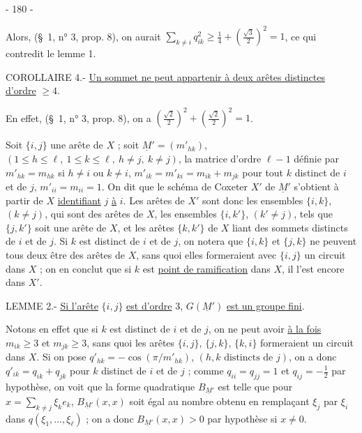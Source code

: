 \begin{center}- 180 -\end{center}

Alors, (\S\ 1, n° 3, prop. 8), on aurait $\displaystyle\sum_{k\ne i}q_{ik}^2\geq\frac14+(\frac{\sqrt3}{2})^2=1$, ce qui contredit le lemme 1.

COROLLAIRE 4.- \uline{Un sommet ne peut appartenir à deux arêtes distinctes d'ordre} $\geq4$.

En effet, (\S\ 1, n° 3, prop. 8), on a $(\frac{\sqrt2}{2})^2+(\frac{\sqrt2}{2})^2=1$.

Soit $\{i,j\}$ une arête de $X$ ; soit $\underline M'=(m'_{hk})$, $(1\leq h\leq\ell,\ 1\leq k\leq\ell,\ h\ne j,\ k\ne j)$, la matrice d'ordre $\ell-1$ définie par $m'_{hk}=m_{hk}$ si $h\ne i$ ou $k\ne i$, $m'_{ik}=m'_{ki}=m_{ik}+m_{jk}$ pour tout $k$ distinct de $i$ et de $j$, $m'_{ii}=m_{ii}=1$. On dit que le schéma de Coxeter $X'$ de $\underline M'$ s'obtient à partir de $X$ \uline{identifiant} $j$ \uline{à} $i$. Les arêtes de $X'$ sont donc les ensembles $\{i,k\}$, $(k\ne j)$, qui sont des arêtes de $X$, les ensembles $\{i,k'\}$, $(k'\ne j)$, tels que $\{j,k'\}$ soit une arête de $X$, et les arêtes $\{k,k'\}$ de $X$ liant des sommets distincts de $i$ et de $j$. Si $k$ est distinct de $i$ et de $j$, on notera que $\{i,k\}$ et $\{j,k\}$ ne peuvent tous deux être des arêtes de $X$, sans quoi elles formeraient avec $\{i,j\}$ un circuit dans $X$ ; on en conclut que si $k$ est \uline{point de ramification} dans $X$, il l'est encore dans $X'$.

LEMME 2.- \uline{Si l'arête} $\{i,j\}$ \uline{est d'ordre} 3, $G(\underline M')$ \uline{est un groupe fini}.

Notons en effet que si $k$ est distinct de $i$ et de $j$, on ne peut avoir \uline{à la fois} $m_{ik}\geq3$ et $m_{jk}\geq3$, sans quoi les arêtes $\{i,j\}$, $\{j,k\}$, $\{k,i\}$ formeraient un circuit dans $X$. Si on pose $q'_{hk}=-\cos(\pi/m'_{hk})$, $(h,k\text{ distincts de }j)$, on a donc $q'_{ik}=q_{ik}+q_{jk}$ pour $k$ distinct de $i$ et de $j$ ; comme $q_{ii}=q_{jj}=1$ et $q_{ij}=-\frac12$ par hypothèse, on voit que la forme quadratique $B_{\underline M'}$ est telle que pour $\displaystyle x=\sum_{k\ne j}\xi_ke_k$, $B_{\underline M'}(x,x)$ soit égal au nombre obtenu en remplaçant $\xi_j$ par $\xi_i$ dans $q(\xi_1,\ldots,\xi_\ell)$ ; on a donc $B_{\underline M'}(x,x)>0$ par hypothèse si $x\ne0$.
